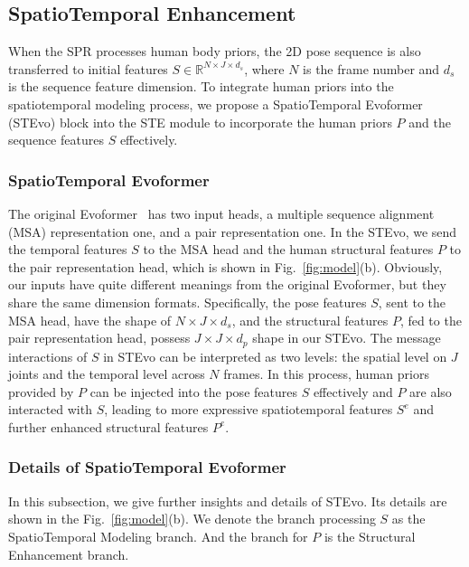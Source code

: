 \documentclass{article}
\begin{document}
\subsection{SpatioTemporal Enhancement}When the SPR processes human body priors, the 2D pose sequence is also transferred to initial features $S\in\mathbb R^{N\times J\times d_s}$, where $N$ is the frame number and $d_s$ is the sequence feature dimension. 
To integrate human priors into the spatiotemporal modeling process, we propose a SpatioTemporal Evoformer (STEvo) block into the STE module to incorporate the human priors $P$ and the sequence features $S$ effectively.\vspace{-0.2em}
\subsubsection{SpatioTemporal Evoformer}
The original Evoformer~\cite{jumper2021highly} has two input heads, a multiple sequence alignment (MSA) representation one, and a pair representation one. In the STEvo, we send the temporal features $S$ to the MSA head and the human structural features $P$ to the pair representation head, which is shown in Fig.~\ref{fig:model}(b). Obviously, our inputs have quite different meanings from the original Evoformer, but they share the same dimension formats. Specifically, the pose features $S$, sent to the MSA head, have the shape of $N\times J\times d_s$, and the structural features $P$, fed to the pair representation head, possess $J\times J\times d_p$ shape in our STEvo. The message interactions of $S$ in STEvo can be interpreted as two levels: the spatial level on $J$ joints and the temporal level across $N$ frames. In this process, human priors provided by $P$ can be injected into the pose features $S$ effectively and $P$ are also interacted with $S$, leading to more expressive spatiotemporal features $S^e$ and further enhanced structural features $P^e$.\vspace{-0.2em}


\subsubsection{Details of SpatioTemporal Evoformer}
In this subsection, we give further insights and details of STEvo. Its details are shown in the Fig.~\ref{fig:model}(b). We denote the branch processing $S$ as the SpatioTemporal Modeling branch. And the branch for $P$ is the Structural Enhancement branch. 
\end{document}
